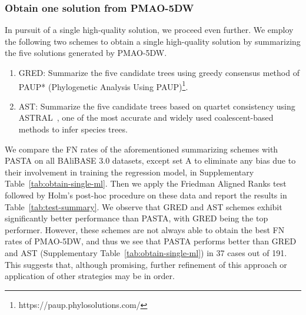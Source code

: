 \documentclass[a4paper,fleqn, review]{cas-dc}
\begin{document}
\subsubsection{Obtain one solution from PMAO-5DW}
In pursuit of a single high-quality solution, we proceed even further. We employ the following two schemes to obtain a single high-quality solution by summarizing the five solutions generated by PMAO-5DW.
\begin{enumerate}
\item GRED: Summarize the five candidate trees using greedy consensus method of PAUP* (Phylogenetic Analysis Using PAUP)\footnote{https://paup.phylosolutions.com/}.
	\item AST: Summarize the five candidate trees based on quartet consistency using ASTRAL~\cite{zhang2018astral}, one of the most accurate and widely used coalescent-based methods to infer species trees.
\end{enumerate}
We compare the FN rates of the aforementioned summarizing schemes with PASTA on all BAliBASE 3.0 datasets, except set A to eliminate any bias due to their involvement in training the regression model, in Supplementary Table~\ref{tab:obtain-single-ml}. Then we apply the Friedman Aligned Ranks test followed by Holm's post-hoc procedure on these data and report the results in Table~\ref{tab:test-summary}. We observe that GRED and AST schemes exhibit significantly better performance than PASTA, with GRED being the top performer. However, these schemes are not always able to obtain the best FN rates of PMAO-5DW, and thus we see that PASTA performs better than GRED and AST (Supplementary Table~\ref{tab:obtain-single-ml}) in 37 cases out of 191. This suggests that, although promising, further refinement of this approach or application of other strategies may be in order.
\end{document}
